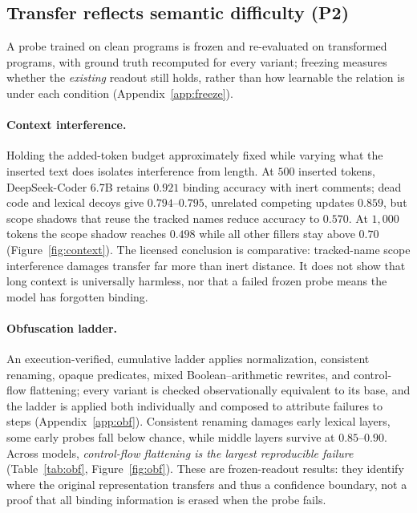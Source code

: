 \documentclass[10pt]{article}
\begin{document}
\subsection{Transfer reflects semantic difficulty (P2)}
A probe trained on clean programs is frozen and re-evaluated on transformed
programs, with ground truth recomputed for every variant; freezing measures
whether the \emph{existing} readout still holds, rather than how learnable the
relation is under each condition (Appendix~\ref{app:freeze}).

\paragraph{Context interference.} Holding the added-token budget approximately
fixed while varying what the inserted text does isolates interference from
length. At $500$ inserted tokens, DeepSeek-Coder 6.7B retains $0.921$ binding
accuracy with inert comments; dead code and lexical decoys give $0.794$--$0.795$,
unrelated competing updates $0.859$, but scope shadows that reuse the tracked
names reduce accuracy to $0.570$. At $1{,}000$ tokens the scope shadow reaches
$0.498$ while all other fillers stay above $0.70$ (Figure~\ref{fig:context}). The
licensed conclusion is comparative: tracked-name scope interference damages
transfer far more than inert distance. It does not show that long context is
universally harmless, nor that a failed frozen probe means the model has
forgotten binding.

\paragraph{Obfuscation ladder.} An execution-verified, cumulative ladder applies
normalization, consistent renaming, opaque predicates, mixed
Boolean--arithmetic rewrites, and control-flow flattening; every variant is
checked observationally equivalent to its base, and the ladder is applied both
individually and composed to attribute failures to steps
(Appendix~\ref{app:obf}). Consistent renaming damages early lexical layers, some
early probes fall below chance, while middle layers survive at $0.85$--$0.90$.
Across models, \emph{control-flow flattening is the largest reproducible failure}
(Table~\ref{tab:obf}, Figure~\ref{fig:obf}). These are frozen-readout results:
they identify where the original representation transfers and thus a confidence
boundary, not a proof that all binding information is erased when the probe fails.
\end{document}
